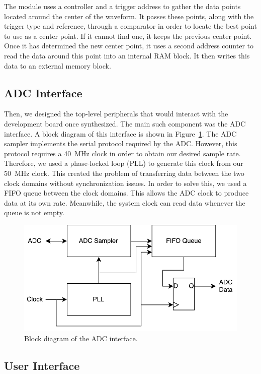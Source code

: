 \documentclass[journal]{IEEEtran}
\begin{document}
The module uses a controller and a trigger address to gather the data points located around the center of the waveform. It passes these points, along with the trigger type and reference, through a comparator in order to locate the best point to use as a center point. If it cannot find one, it keeps the previous center point. Once it has determined the new center point, it uses a second address counter to read the data around this point into an internal RAM block. It then writes this data to an external memory block.

\subsection{ADC Interface}

Then, we designed the top-level peripherals that would interact with the development board once synthesized. The main such component was the ADC interface. A block diagram of this interface is shown in Figure~\ref{fig:adc_interface}. The ADC sampler implements the serial protocol required by the ADC. However, this protocol requires a 40~MHz clock in order to obtain our desired sample rate. Therefore, we used a phase-locked loop (PLL) to generate this clock from our 50~MHz clock. This created the problem of transferring data between the two clock domains without synchronization issues. In order to solve this, we used a FIFO queue between the clock domains. This allows the ADC clock to produce data at its own rate. Meanwhile, the system clock can read data whenever the queue is not empty.

\begin{figure}[!htb]
  \centering
  \includegraphics[width=\columnwidth]{diagrams/adc_interface.pdf}
  \caption{Block diagram of the ADC interface.}
  \label{fig:adc_interface}
\end{figure}

\subsection{User Interface}
\end{document}
